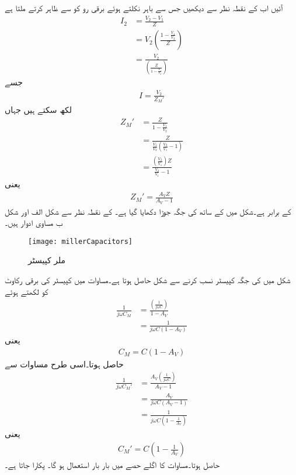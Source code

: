 آئیں اب  کے نقطہ نظر سے دیکھیں جس سے باہر نکلتے ہوئے برقی رو کو  سے ظاہر کرتے ملتا ہے
\begin{align*}
I_2&=\frac{V_2 - V_1}{Z}\\
&=V_2 \left(\frac{1-\frac{V_1}{V_2} }{Z}\right)\\
&=\frac{V_2}{\left(\frac{Z}{1-\frac{V_1}{V_2}} \right)}
\end{align*}
جسے
\begin{align}
I=\frac{V_2}{Z_M'}
\end{align}
لکھ سکتے ہیں جہاں
\begin{align*}
Z_M'&=\frac{Z}{1-\frac{V_1}{V_2}}\\
&=\frac{Z}{\frac{V_1}{V_2}  \left(\frac{V_2}{V_1}-1 \right)}\\
&=\frac{\left(\frac{V_2}{V_1} \right) Z}{\frac{V_2}{V_1} -1}
\end{align*}
یعنی
\begin{align} \label{مساوات_تعدد_ردعمل_ملر_رکاوٹ_الف}
Z_M'=\frac{A_V Z}{A_V-1}
\end{align}
کے برابر ہے۔شکل  میں  کے ساتھ  کی جگہ  جوڑا دکھایا گیا ہے۔ کے نقطہ نظر سے شکل  الف اور شکل  ب مساوی ادوار ہیں۔ 
\begin{figure}
\centering
\texttt{[image: millerCapacitors]}
\caption{ملر کپیسٹر}
\label{شکل_تعددی_ردعمل_ملر_کپیسٹر}
\end{figure}

شکل  میں  کی جگہ کپیسٹر  نسب کرنے سے شکل  حاصل ہوتا ہے۔مساوات  میں کپیسٹر کی برقی رکاوٹ کو  لکھتے ہوئے
\begin{align*}
\frac{1}{j \omega C_M}&= \frac{\left(\frac{1}{j \omega C} \right)}{1-A_V}\\
&=\frac{1}{j \omega C \left(1-A_V \right)}
\end{align*}
یعنی
\begin{align} \label{مساوات_تعددی_ردعمل_ملر_کپیسٹر}
C_M=C \left(1-A_V \right)
\end{align}
حاصل ہوتا۔اسی طرح مساوات  سے 
\begin{align*}
\frac{1}{j \omega C_M'}&=\frac{A_V \left(\frac{1}{j \omega C} \right)}{A_V -1} \\
&=\frac{A_V}{j \omega C \left(A_V -1 \right)}\\
&=\frac{1}{j \omega C \left(1-\frac{1}{A_V} \right)}
\end{align*}
یعنی
\begin{align} \label{مساوات_تعددی_ردعمل_ملر_کپیسٹر_الف}
C_M'=C \left(1-\frac{1}{A_V} \right)
\end{align}
حاصل ہوتا۔مساوات  کا اگلے حصے میں بار بار استعمال ہو گا۔  پکارا جاتا ہے۔

